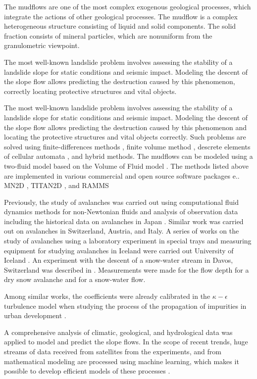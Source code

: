 \documentclass[sensors,article,submit,moreauthors,pdftex]{Definitions/mdpi}
\begin{document}
The mudflows are one of the most complex exogenous geological processes, which integrate the actions of other geological processes. The mudflow is a complex heterogeneous structure consisting of liquid and solid components. The solid fraction consists of mineral particles, which are nonuniform from the granulometric viewpoint.

The most well-known landslide problem involves assessing the stability of a landslide slope for static conditions and seismic impact. Modeling the descent of the slope flow allows predicting the destruction caused by this phenomenon, correctly locating protective structures and vital objects.

The most well-known landslide problem involves assessing the stability of a landslide slope for static conditions and seismic impact. Modeling the descent of the slope flow allows predicting the destruction caused by this phenomenon and locating the protective structures and vital objects correctly. Such problems are solved using finite-differences methods \cite{Bernander2016}, finite volume method \cite{liu2007application}, descrete elements \cite{Liu2020} of cellular automata \cite{piegari2006cellular}, and hybrid methods. The mudflows can be modeled using a two-fluid model based on the Volume of Fluid model \cite{Hirt1981}. The methods listed above are implemented in various commercial and open source software packages e.. MN2D \cite{Naaim2002}, TITAN2D \cite{Pitman2003}, and RAMMS

Previously, the study of avalanches was carried out using computational fluid dynamics methods for non-Newtonian fluids and analysis of observation data including the historical data on avalanches in Japan \cite{Oda2011, Yamaguchi2017}. Similar work was carried out on avalanches in Switzerland, Austria, and Italy. A series of works on the study of avalanches using a laboratory experiment in special trays and measuring equipment for studying avalanches in Iceland were carried out University of Iceland  \cite{IceThesKatr, IceThesJon}. An experiment with the descent of a snow-water stream in Davos, Switzerland was described in \cite{Jaedicke2006}. Measurements were made for the flow depth for a dry snow avalanche and for a snow-water flow.

Among similar works, the coefficients were already calibrated in the $\kappa-\epsilon$ turbulence model when studying the process of the propagation of impurities in urban development \cite{Guillas2014}.

A comprehensive analysis of climatic, geological, and hydrological data was applied to model and predict the slope flows. In the scope of recent trends, huge streams of data received from satellites from the experiments, and from mathematical modeling are processed using machine learning, which makes it possible to develop efficient models of these processes \cite{GeoML, Ma2020}.
\end{document}
